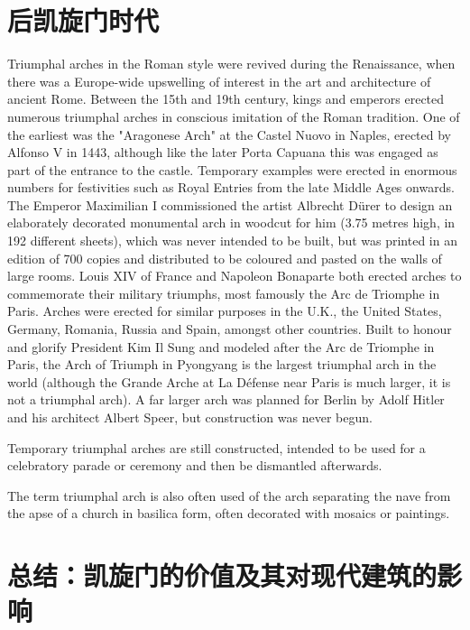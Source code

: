 \documentclass[a4paper,dvipdfm]{article}
\begin{document}
\section{后凯旋门时代}

Triumphal arches in the Roman style were revived during the
Renaissance, when there was a Europe-wide upswelling of interest in
the art and architecture of ancient Rome. Between the 15th and 19th
century, kings and emperors erected numerous triumphal arches in
conscious imitation of the Roman tradition. One of the earliest was
the "Aragonese Arch" at the Castel Nuovo in Naples, erected by Alfonso
V in 1443, although like the later Porta Capuana this was engaged as
part of the entrance to the castle. Temporary examples were erected in
enormous numbers for festivities such as Royal Entries from the late
Middle Ages onwards. The Emperor Maximilian I commissioned the artist
Albrecht Dürer to design an elaborately decorated monumental arch in
woodcut for him (3.75 metres high, in 192 different sheets), which was
never intended to be built, but was printed in an edition of 700
copies and distributed to be coloured and pasted on the walls of large
rooms. Louis XIV of France and Napoleon Bonaparte both erected arches
to commemorate their military triumphs, most famously the Arc de
Triomphe in Paris. Arches were erected for similar purposes in the
U.K., the United States, Germany, Romania, Russia and Spain, amongst
other countries. Built to honour and glorify President Kim Il Sung and
modeled after the Arc de Triomphe in Paris, the Arch of Triumph in
Pyongyang is the largest triumphal arch in the world (although the
Grande Arche at La Défense near Paris is much larger, it is not a
triumphal arch). A far larger arch was planned for Berlin by Adolf
Hitler and his architect Albert Speer, but construction was never
begun.

Temporary triumphal arches are still constructed, intended to be used
for a celebratory parade or ceremony and then be dismantled
afterwards.

The term triumphal arch is also often used of the arch separating the
nave from the apse of a church in basilica form, often decorated with
mosaics or paintings.



\section{总结：凯旋门的价值及其对现代建筑的影响}

\appendix{}



\end{document}

